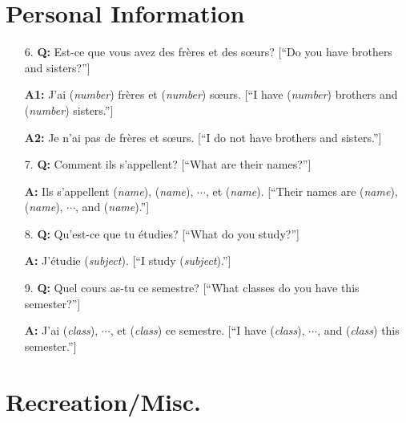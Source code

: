 \documentclass{article}
\theoremstyle{definition}
\theoremstyle{remark}
\theoremstyle{definition}
\begin{document}
\section{Personal Information}
\hline

\vspace{4mm}

\begin{enumerate}[leftmargin=*]
    \item[6.]\textbf{Q:} Est-ce que vous avez des fr\`eres et des s\oe urs? [``Do you have brothers and sisters?'']\par 
        \noindent\textbf{A1:} J'ai (\textit{number}) fr\`eres et (\textit{number}) s\oe urs. [``I have (\textit{number}) brothers and (\textit{number}) sisters.'']\par 
        \noindent\textbf{A2:} Je n'ai pas de fr\`eres et s\oe urs. [``I do not have brothers and sisters.'']\par \vspace{3mm}
        \hline
        
    \item[7.]\textbf{Q:} Comment ils s'appellent? [``What are their names?'']\par 
        \noindent\textbf{A:} Ils s'appellent (\textit{name}), (\textit{name}), $\cdots$, et (\textit{name}). [``Their names are (\textit{name}), (\textit{name}), $\cdots$, and (\textit{name}).'']
        
    \item[8.]\textbf{Q:} Qu'est-ce que tu \'etudies? [``What do you study?''] \par 
        \noindent\textbf{A:} J'\'etudie (\textit{subject}). [``I study (\textit{subject}).'']\par \vspace{3mm}
        \hline
        
    \item[9.]\textbf{Q:} Quel cours as-tu ce semestre? [``What classes do you have this semester?'']\par 
        \noindent\textbf{A:} J'ai (\textit{class}), $\cdots$, et (\textit{class}) ce semestre. [``I have (\textit{class}), $\cdots$, and (\textit{class}) this semester.'']
        
    \end{enumerate}
        
    \newpage
    
    \section{Recreation/Misc.}
    \hline 
    
\end{document}
